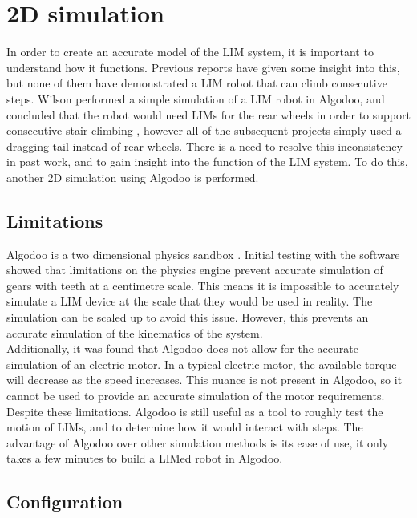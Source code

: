 \chapter{2D simulation}

In order to create an accurate model of the LIM system, it is important to understand how it functions. Previous reports have given some insight into this, but none of them have demonstrated a LIM robot that can climb consecutive steps. Wilson performed a simple simulation of a LIM robot in Algodoo, and concluded that the robot would need LIMs for the rear wheels in order to support consecutive stair climbing \citep{Wilson-2013}, however all of the subsequent projects simply used a dragging tail instead of rear wheels. There is a need to resolve this inconsistency in past work, and to gain insight into the function of the LIM system. To do this, another 2D simulation using Algodoo is performed.

\section{Limitations}

Algodoo is a two dimensional physics sandbox \citep{Algodoo}. Initial testing with the software showed that limitations on the physics engine prevent accurate simulation of gears with teeth at a centimetre scale. This means it is impossible to accurately simulate a LIM device at the scale that they would be used in reality. The simulation can be scaled up to avoid this issue. However, this prevents an accurate simulation of the kinematics of the system.\\

Additionally, it was found that Algodoo does not allow for the accurate simulation of an electric motor. In a typical electric motor, the available torque will decrease as the speed increases. This nuance is not present in Algodoo, so it cannot be used to provide an accurate simulation of the motor requirements. Despite these limitations. Algodoo is still useful as a tool to roughly test the motion of LIMs, and to determine how it would interact with steps. The advantage of Algodoo over other simulation methods is its ease of use, it only takes a few minutes to build a LIMed robot in Algodoo.

\section{Configuration}


